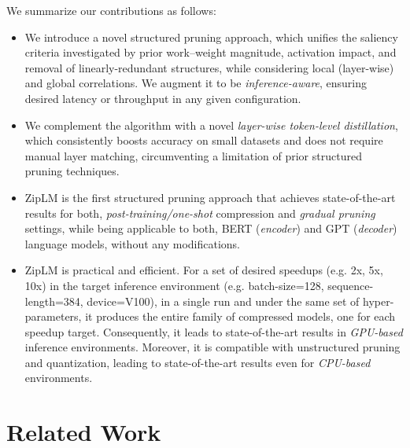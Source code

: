 \documentclass{article}
\newcommand{\ourmethod}{ZipLM}
\theoremstyle{plain}
\theoremstyle{definition}
\theoremstyle{remark}
\begin{document}
We summarize our contributions as follows: 
\begin{itemize}
    \item We introduce a novel structured pruning approach, which unifies the saliency criteria investigated by prior work--weight magnitude, activation impact, and removal of \mbox{linearly-redundant} structures, while considering local (layer-wise) and global correlations. We augment it to be \emph{inference-aware}, ensuring desired latency or throughput in any given configuration. 
    \item We complement the algorithm with a novel \emph{layer-wise token-level distillation}, which consistently boosts accuracy on small datasets and does not require manual layer matching, circumventing a limitation of prior structured pruning techniques. 
    \item \ourmethod{} is the first structured pruning approach that achieves state-of-the-art results for both, \emph{post-training/one-shot} compression and \emph{gradual pruning} settings, while being applicable to both, BERT (\emph{encoder}) and GPT (\emph{decoder}) language models, without any modifications.
    \item \ourmethod{} is practical and efficient. For a set of desired speedups (e.g. 2x, 5x, 10x) in the target inference environment (e.g. batch-size=128, sequence-length=384, device=V100), in a single run and under the same set of hyper-parameters, it produces the entire family of compressed models, one for each speedup target. Consequently, it leads to  state-of-the-art results in \emph{GPU-based} inference environments. Moreover, it is compatible with unstructured pruning and quantization, leading to state-of-the-art results even for \emph{CPU-based} environments.
\end{itemize}

\section{Related Work}
\end{document}
